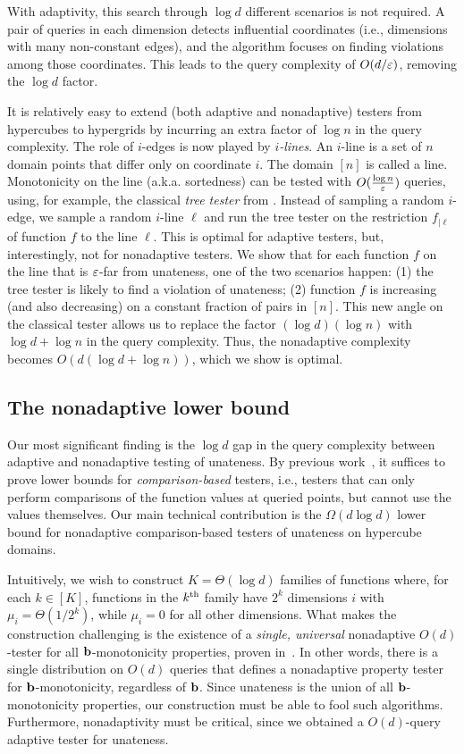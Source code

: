 With adaptivity, this search  through $\log d$ different scenarios is not required.
A pair of queries in each dimension detects influential coordinates (i.e., dimensions with many non-constant edges), and the algorithm focuses
on finding violations among those coordinates. This leads to the query complexity of $O(d/\varepsilon)$, removing the $\log d$ factor.

It is relatively easy to extend (both adaptive and nonadaptive) testers from hypercubes to hypergrids by incurring an extra factor of $\log n$ in the query complexity. The role of $i$-edges is now played by {\em $i$-lines}. An $i$-line is a set of $n$ domain points that differ only on coordinate $i$. The domain $[n]$ is called a line. Monotonicity on the line (a.k.a. sortedness) can be tested with $O(\frac{\log n}{\varepsilon})$ queries, using, for example, the classical {\em tree tester} from \cite{EKKRV00}. Instead of sampling a random $i$-edge, we sample a random $i$-line $\ell$ and run the tree tester on the restriction $f_{|\ell}$ of function $f$ to the line $\ell$.
This is optimal for adaptive testers, but, interestingly, not for nonadaptive testers.
We show that for each function $f$ on the line that is $\varepsilon$-far from unateness, one of the two scenarios happen: (1) the tree tester is likely to find a violation of unateness; (2) function $f$ is increasing (and also decreasing) on a constant fraction of pairs in $[n]$. This new angle on the classical tester allows us to replace the factor $(\log d)(\log n)$ with $\log d + \log n$ in the query complexity.
Thus, the nonadaptive complexity becomes $O(d(\log d + \log n))$, which we show is optimal.

\subsection{The nonadaptive lower bound}
Our most significant finding is the $\log d$ gap in the query complexity between adaptive and nonadaptive testing of unateness.
By previous work~\cite{Fis04,CS14}, it suffices to prove lower bounds for {\em comparison-based} testers, i.e., testers that
can only perform comparisons of the function values at queried points, but cannot use the values themselves.
Our main technical contribution is the $\Omega(d\log d)$ lower
bound for nonadaptive comparison-based testers of unateness on hypercube domains.

Intuitively, we wish to construct $K=\Theta(\log d)$ families of functions where,
for each $k \in [K]$, functions in the ${k}^{\mathrm{th}}$ family have
$2^k$ dimensions $i$ with $\mu_i=\Theta(1/2^k)$, while $\mu_i=0$ for all other dimensions.
What makes the construction challenging is the existence of a \emph{single, universal} nonadaptive
$O(d)$-tester for all
$\mathbf{b}$-monotonicity properties, proven in~\cite{CDJS17}. In other words, there is a single
distribution on  $O(d)$ queries that defines a nonadaptive property tester for
$\mathbf{b}$-monotonicity, regardless of $\mathbf{b}$.
Since unateness
is the union of all $\mathbf{b}$-monotonicity properties,
our construction must be able to fool such algorithms.
Furthermore, nonadaptivity must be critical, since
we obtained a $O(d)$-query adaptive tester for unateness.

